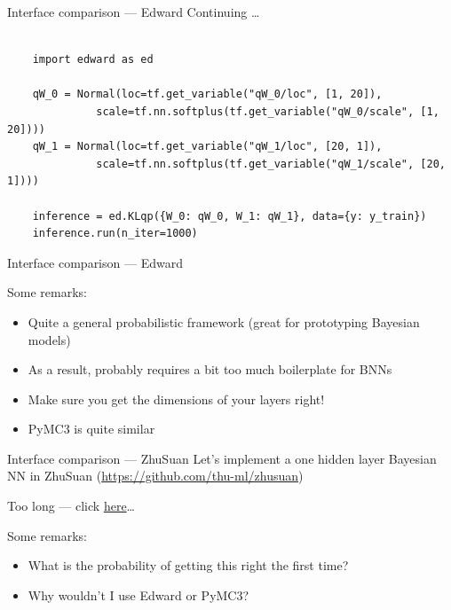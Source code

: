 \documentclass[lualatex, aspectratio=169]{beamer}
\begin{document}
\begin{frame}[fragile]{Interface comparison --- Edward}
  Continuing \ldots
  
  \begin{verbatim}

    import edward as ed

    qW_0 = Normal(loc=tf.get_variable("qW_0/loc", [1, 20]),
              scale=tf.nn.softplus(tf.get_variable("qW_0/scale", [1, 20])))
    qW_1 = Normal(loc=tf.get_variable("qW_1/loc", [20, 1]),
              scale=tf.nn.softplus(tf.get_variable("qW_1/scale", [20, 1])))

    inference = ed.KLqp({W_0: qW_0, W_1: qW_1}, data={y: y_train})
    inference.run(n_iter=1000)
  \end{verbatim}
\end{frame}


\begin{frame}{Interface comparison --- Edward}

  Some remarks:
  \begin{itemize}
    \item Quite a general probabilistic framework (great for prototyping Bayesian models)
    \item As a result, probably requires a bit too much boilerplate for BNNs
    \item Make sure you get the dimensions of your layers right!
    \item PyMC3 is quite similar
  \end{itemize}

\end{frame}


\begin{frame}{Interface comparison --- ZhuSuan}
  Let's implement a one hidden layer Bayesian NN in ZhuSuan (\url{https://github.com/thu-ml/zhusuan})

  \hspace{1cm}

  Too long --- click \href{http://zhusuan.readthedocs.io/en/latest/tutorials/bayesian_nn.html}{here}\ldots  

  \hspace{1cm}

  Some remarks:
  \begin{itemize}
    \item What is the probability of getting this right the first time?
    \item Why wouldn't I use Edward or PyMC3?
  \end{itemize}

\end{frame}
\end{document}
